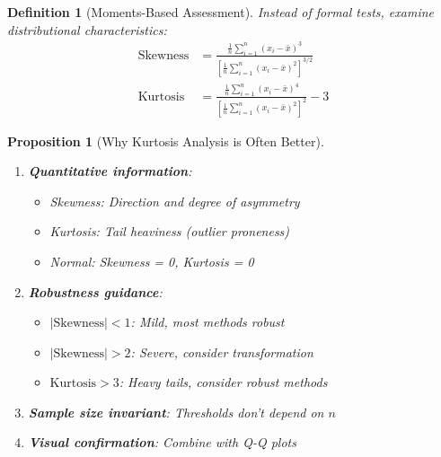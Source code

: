 \documentclass{article}
\newtheorem{definition}{Definition}
\newtheorem{proposition}{Proposition}
\begin{document}
\begin{definition}[Moments-Based Assessment]
Instead of formal tests, examine distributional characteristics:
\begin{align}
\text{Skewness} &= \frac{\frac{1}{n}\sum_{i=1}^n (x_i - \bar{x})^3}{\left[\frac{1}{n}\sum_{i=1}^n (x_i - \bar{x})^2\right]^{3/2}} \\
\text{Kurtosis} &= \frac{\frac{1}{n}\sum_{i=1}^n (x_i - \bar{x})^4}{\left[\frac{1}{n}\sum_{i=1}^n (x_i - \bar{x})^2\right]^2} - 3
\end{align}
\end{definition}

\begin{proposition}[Why Kurtosis Analysis is Often Better]
\begin{enumerate}
    \item \textbf{Quantitative information}:
    \begin{itemize}
        \item Skewness: Direction and degree of asymmetry
        \item Kurtosis: Tail heaviness (outlier proneness)
        \item Normal: Skewness = 0, Kurtosis = 0
    \end{itemize}
    
    \item \textbf{Robustness guidance}:
    \begin{itemize}
        \item $|\text{Skewness}| < 1$: Mild, most methods robust
        \item $|\text{Skewness}| > 2$: Severe, consider transformation
        \item $\text{Kurtosis} > 3$: Heavy tails, consider robust methods
    \end{itemize}
    
    \item \textbf{Sample size invariant}: Thresholds don't depend on $n$
    
    \item \textbf{Visual confirmation}: Combine with Q-Q plots
\end{enumerate}
\end{proposition}
\end{document}

